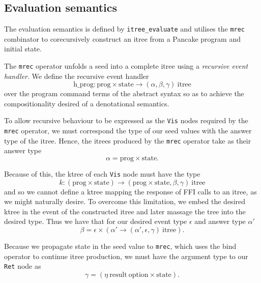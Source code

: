 \documentclass[12pt,a4paper]{report}
\begin{document}
\subsection{Evaluation semantics}
\label{sec:evaluation-semantics}

The evaluation semantics is defined by \texttt{itree\_evaluate} and utilises the \texttt{mrec} combinator to corecursively construct an itree from a Pancake program and initial state.

The \texttt{mrec} operator unfolds a seed into a complete itree using a \emph{recursive event handler}. We define the recursive event handler
\begin{equation*}
  \text{h\_prog} : \text{prog} \times \text{state} \to (\alpha, \beta, \gamma)\ \text{itree}
\end{equation*}
over the program command terms of the abstract syntax so as to achieve the compositionality desired of a denotational semantics.

To allow recursive behaviour to be expressed as the \texttt{Vis} nodes required by the \texttt{mrec} operator, we must correspond the type of our seed values with the answer type of the itree. Hence, the itrees produced by the \texttt{mrec} operator take as their answer type
\begin{equation*}
  \alpha = \text{prog} \times \text{state}.
\end{equation*}

Because of this, the ktree of each \texttt{Vis} node must have the type
\begin{equation*}
  k : (\text{prog} \times \text{state}) \to (\text{prog} \times \text{state}, \beta, \gamma)\ \text{itree}
\end{equation*}
and so we cannot define a ktree mapping the response of FFI calls to an itree, as we might naturally desire. To overcome this limitation, we embed the desired ktree in the event of the constructed itree and later massage the tree into the desired type. Thus we have that for our desired event type $\epsilon$ and answer type $\alpha'$
\begin{equation*}
  \beta = \epsilon \times (\alpha' \to (\alpha', \epsilon, \gamma)\ \text{itree}).
\end{equation*}

Because we propagate state in the seed value to \texttt{mrec}, which uses the bind operator to continue itree production, we must have the argument type to our \texttt{Ret} node as
\begin{equation*}
  \gamma = (\eta\ \text{result}\ \text{option} \times \text{state}).
\end{equation*}
\end{document}
